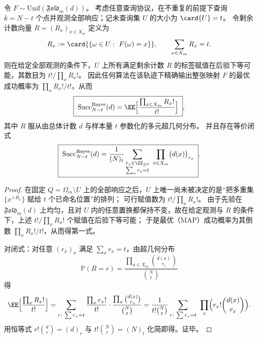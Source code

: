 \begin{theorem}\label{thm:pom-microcanonical-fold-bayes-success-Nminus-t}
令 \(F\sim\mathrm{Unif}(\mathfrak{Fold}_m(d))\)。
考虑任意查询协议，在不重复的前提下查询 \(k=N-t\) 个点并观测全部响应；记未查询集 \(U\) 的大小为 \(\card{U}=t\)。
令剩余计数向量 \(R=(R_x)_{x\in X_m}\) 定义为
\[
R_x:=\card{\{\omega\in U:\ F(\omega)=x\}},\qquad \sum_{x\in X_m}R_x=t.
\]
则在给定全部观测的条件下，\(U\) 上所有满足剩余计数 \(R\) 的标签赋值在后验下等可能，其数目为 \(t!/\prod_x R_x!\)。
因此任何算法在该轨迹下精确输出整张映射 \(F\) 的最优成功概率为 \(\prod_x R_x!/t!\)，从而
\[
\boxed{\;
\mathrm{Succ}^{\mathrm{Bayes}}_{N-t}(d)
=\EE\Bigl[\frac{\prod_{x\in X_m}R_x!}{t!}\Bigr]\;},
\]
其中 \(R\) 服从由总体计数 \(d\) 与样本量 \(t\) 参数化的多元超几何分布。
并且存在等价闭式
\[
\boxed{\;
\mathrm{Succ}^{\mathrm{Bayes}}_{N-t}(d)
=\frac{1}{(N)_t}\sum_{\substack{r_x\in\ZZ_{\ge 0}\\ \sum_x r_x=t}}\ \prod_{x\in X_m}\bigl(d(x)\bigr)_{r_x}\; } .
\]
\end{theorem}
\begin{proof}
在固定 \(Q=\Omega_m\setminus U\) 上的全部响应之后，\(U\) 上唯一尚未被决定的是“把多重集 \(\{x^{\times R_x}\}\) 赋给 \(t\) 个已命名位置”的排列；
可行赋值数为 \(t!/\prod_x R_x!\)。
由于先验在 \(\mathfrak{Fold}_m(d)\) 上均匀，且对 \(U\) 内的任意置换都保持不变，故在给定观测与 \(R\) 的条件下，上述 \(t!/\prod_x R_x!\) 个赋值在后验下等可能；
于是最优（MAP）成功概率为其倒数 \(\prod_x R_x!/t!\)，从而得第一式。
\par
对闭式：对任意 \((r_x)_x\) 满足 \(\sum_x r_x=t\)，由超几何分布
\[
\mathbb{P}(R=r)=\frac{\prod_{x\in X_m}\binom{d(x)}{r_x}}{\binom{N}{t}}
\]
得
\[
\EE\Bigl[\frac{\prod_x R_x!}{t!}\Bigr]
=\sum_{r:\ \sum r_x=t}\frac{\prod_x r_x!}{t!}\cdot \frac{\prod_x\binom{d(x)}{r_x}}{\binom{N}{t}}
=\frac{1}{t!\binom{N}{t}}\sum_{r:\ \sum r_x=t}\ \prod_x\Bigl(r_x!\binom{d(x)}{r_x}\Bigr).
\]
用恒等式 \(r!\binom{d}{r}=(d)_r\) 与 \(t!\binom{N}{t}=(N)_t\) 化简即得。证毕。
\end{proof}






